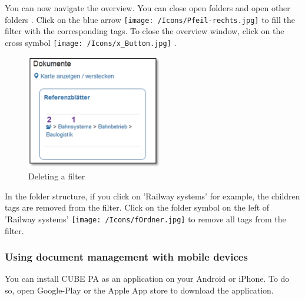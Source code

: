 You can now navigate the overview. You can close open folders  and open other folders . Click on the blue arrow \texttt{[image: /Icons/Pfeil-rechts.jpg]}  to fill the filter with the corresponding tags. To close the overview window, click on the cross symbol \texttt{[image: /Icons/x\_Button.jpg]} .


\pagebreak

\begin{figure}   %
  \vspace{-30pt}      %
  \begin{center}
    \includegraphics[height=50mm]{../chapters/11_Dokumentenablage/pictures/11-htag_FilterLoeschen.jpg}
  \end{center}
  \vspace{-20pt}
  \caption{Deleting a filter}
  \vspace{-10pt}
\end{figure}
In the folder structure, if you click on 'Railway systems'  for example, the children tags are removed from the filter. Click on the folder symbol on the left of 'Railway systems' \texttt{[image: /Icons/fOrdner.jpg]}  to remove all tags from the filter.

\vspace{\baselineskip}
\vspace{\baselineskip}
\vspace{\baselineskip}
\vspace{\baselineskip}

\subsubsection{Using document management with mobile devices}

You can install CUBE PA as an application on your Android or iPhone. To do so, open Google-Play or the Apple App store to download the application.

